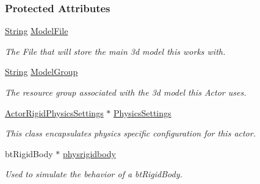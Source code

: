 \subsubsection*{Protected Attributes}
\begin{DoxyCompactItemize}
\item 
\hypertarget{classphys_1_1ActorRigid_a8719d076cf8790e3523af7c8a7666478}{
\hyperlink{namespacephys_aa03900411993de7fbfec4789bc1d392e}{String} \hyperlink{classphys_1_1ActorRigid_a8719d076cf8790e3523af7c8a7666478}{ModelFile}}
\label{classphys_1_1ActorRigid_a8719d076cf8790e3523af7c8a7666478}

\begin{DoxyCompactList}\small\item\em The File that will store the main 3d model this works with. \item\end{DoxyCompactList}\item 
\hypertarget{classphys_1_1ActorRigid_a7c72e4c7c89964be93dc5c6c0ed64578}{
\hyperlink{namespacephys_aa03900411993de7fbfec4789bc1d392e}{String} \hyperlink{classphys_1_1ActorRigid_a7c72e4c7c89964be93dc5c6c0ed64578}{ModelGroup}}
\label{classphys_1_1ActorRigid_a7c72e4c7c89964be93dc5c6c0ed64578}

\begin{DoxyCompactList}\small\item\em The resource group associated with the 3d model this Actor uses. \item\end{DoxyCompactList}\item 
\hypertarget{classphys_1_1ActorRigid_af86eb5347cb6bb31a561404efc3d8245}{
\hyperlink{classphys_1_1ActorRigidPhysicsSettings}{ActorRigidPhysicsSettings} $\ast$ \hyperlink{classphys_1_1ActorRigid_af86eb5347cb6bb31a561404efc3d8245}{PhysicsSettings}}
\label{classphys_1_1ActorRigid_af86eb5347cb6bb31a561404efc3d8245}

\begin{DoxyCompactList}\small\item\em This class encapsulates physics specific configuration for this actor. \item\end{DoxyCompactList}\item 
\hypertarget{classphys_1_1ActorRigid_a690889f942e177644f4f8521f509c88d}{
btRigidBody $\ast$ \hyperlink{classphys_1_1ActorRigid_a690889f942e177644f4f8521f509c88d}{physrigidbody}}
\label{classphys_1_1ActorRigid_a690889f942e177644f4f8521f509c88d}

\begin{DoxyCompactList}\small\item\em Used to simulate the behavior of a btRigidBody. \item\end{DoxyCompactList}\end{DoxyCompactItemize}
